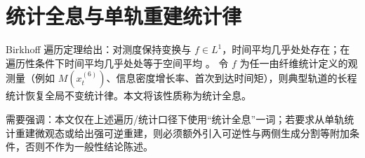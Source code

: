 \section{统计全息与单轨重建统计律}

Birkhoff 遍历定理给出：对测度保持变换与 $f\in L^1$，时间平均几乎处处存在；在遍历性条件下时间平均几乎处处等于空间平均 \cite{EOM_Birkhoff}。
令 $f$ 为任一由纤维统计定义的观测量（例如 $M(x_t^{(6)})$、信息密度增长率、首次到达时间矩），则典型轨道的长程统计恢复全局不变统计律。本文将该性质称为统计全息。

需要强调：本文仅在上述遍历/统计口径下使用“统计全息”一词；若要求从单轨统计重建微观态或给出强可逆重建，则必须额外引入可逆性与两侧生成分割等附加条件，否则不作为一般性结论陈述。

